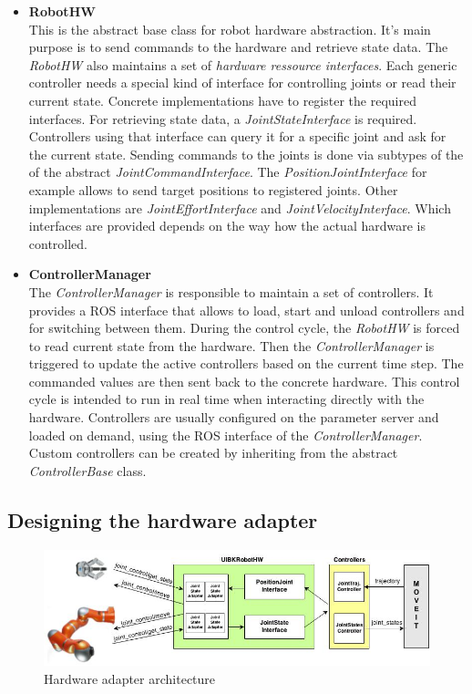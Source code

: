 \begin{itemize}

\item \textbf{RobotHW} \\

This is the abstract base class for robot hardware abstraction. It's main purpose is to send commands to the hardware and retrieve state data. The \emph{RobotHW} also maintains a set of \emph{hardware ressource interfaces}. Each generic controller needs a special kind of interface for controlling joints or read their current state. Concrete implementations have to register the required interfaces. For retrieving state data, a \emph{JointStateInterface} is required. Controllers using that interface can query it for a specific joint and ask for the current state. Sending commands to the joints is done via subtypes of the of the abstract \emph{JointCommandInterface}. The \emph{PositionJointInterface} for example allows to send target positions to registered joints. Other implementations are \emph{JointEffortInterface} and \emph{JointVelocityInterface}. Which interfaces are provided depends on the way how the actual hardware is controlled.

\item \textbf{ControllerManager} \\

The \emph{ControllerManager} is responsible to maintain a set of controllers. It provides a ROS interface that allows to load, start and unload controllers and for switching between them. During the control cycle, the \emph{RobotHW} is forced to read current state from the hardware. Then the \emph{ControllerManager} is triggered to update the active controllers based on the current time step. The commanded values are then sent back to the concrete hardware. This control cycle is intended to run in real time when interacting directly with the hardware. Controllers are usually configured on the parameter server and loaded on demand, using the ROS interface of the \emph{ControllerManager}. Custom controllers can be created by inheriting from the abstract  \emph{ControllerBase} class.  

\end{itemize}

\subsection{Designing the hardware adapter}

\begin{figure}[h]
	\centering
  	\includegraphics[width=1.0\textwidth]{images/hardware_adapter.jpg}
	\caption{Hardware adapter architecture}
	\label{fig:hardware_adapter}
\end{figure}

